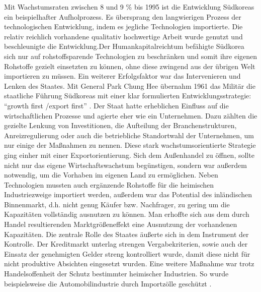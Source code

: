 Mit Wachstumsraten zwischen 8 und 9 {\%} bis 1995 ist die Entwicklung S{\"u}dkoreas ein beispielhafter Aufholprozess. Es {\"u}bersprang den langwierigen Prozess der technologischen Entwicklung, indem es jegliche Technologien importierte. Die relativ reichlich vorhandene qualitativ hochwertige Arbeit wurde genutzt und beschleunigte die Entwicklung.\newline Der Humankapitalreichtum bef{\"a}higte S{\"u}dkorea sich nur auf rohstoffsparende Technologien zu beschr{\"a}nken und somit ihre eigenen Rohstoffe gezielt einsetzten zu k{\"o}nnen, ohne diese zwingend aus der {\"u}brigen Welt importieren zu m{\"u}ssen. \newline Ein weiterer Erfolgsfaktor war das Intervenieren und Lenken des Staates.  Mit General Park Chung Hee {\"u}bernahm 1961 das Milit{\"a}r die staatliche F{\"u}hrung S{\"u}dkoreas mit einer klar formulierten Entwicklungsstrategie: "`growth first /export first"' \citep{Engelhard.2004}. Der Staat hatte erheblichen Einfluss auf die wirtschaftlichen Prozesse und agierte eher wie ein Unternehmen. Dazu z{\"a}hlten die gezielte Lenkung von Investitionen, die Aufteilung der Branchenstrukturen, Anreizregulierung oder auch die betriebliche Standortwahl der Unternehmen, um nur einige der Ma{\ss}nahmen zu nennen. Diese stark wachstumsorientierte Strategie ging einher mit einer Exportorientierung. Sich dem Au{\ss}enhandel zu {\"o}ffnen, sollte nicht nur das eigene Wirtschaftswachstum beg{\"u}nstigen, sondern war au{\ss}erdem notwendig, um die Vorhaben im eigenen Land zu erm{\"o}glichen. Neben Technologien mussten auch erg{\"a}nzende Rohstoffe f{\"u}r die heimischen Industriezweige importiert werden, au{\ss}erdem war das Potential des inl{\"a}ndischen Binnenmarkt, d.h. nicht genug Käufer bzw. Nachfrager, zu gering um die Kapazitäten vollst{\"a}ndig ausnutzen zu k{\"o}nnen. Man erhoffte sich aus dem durch Handel resultierenden Marktgrö{\ss}eneffekt eine Ausnutzung der vorhandenen Kapazitäten. \newline Die zentrale Rolle des Staates {\"a}u{\ss}erte sich in dem Instrument der Kontrolle. Der Kreditmarkt unterlag strengen Vergabekriterien, sowie auch der Einsatz der genehmigten Gelder streng kontrolliert wurde, damit diese nicht f{\"u}r nicht produktive Absichten eingesetzt wurden. Eine weitere Ma{\ss}nahme war trotz Handelsoffenheit der Schutz bestimmter heimischer Industrien. So wurde beispielsweise die  Automobilindustrie durch Importz{\"o}lle gesch{\"u}tzt \citep{Engelhard.2004}. \newline


